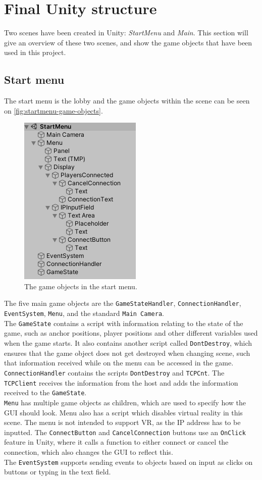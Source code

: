 \section{Final Unity structure}
Two scenes have been created in Unity: \textit{StartMenu} and \textit{Main}.
This section will give an overview of these two scenes, and show the game objects that have been used in this project.

\subsection{Start menu}
The start menu is the lobby and the game objects within the scene can be seen on \autoref{fig:startmenu-game-objects}.

\begin{figure}[H]
    \centering
    \includegraphics[width=0.4\linewidth]{figures/startmenu.PNG}
    \caption{The game objects in the start menu.}
    \label{fig:startmenu-game-objects}
\end{figure}
\noindent
The five main game objects are the \texttt{GameStateHandler}, \texttt{ConnectionHandler}, \texttt{EventSystem}, \texttt{Menu}, and the standard \texttt{Main Camera}.
\\
The \texttt{GameState} contains a script with information relating to the state of the game, such as anchor positions, player positions and other different variables used when the game starts.
It also contains another script called \texttt{DontDestroy}, which ensures that the game object does not get destroyed when changing scene, such that information received while on the menu can be accessed in the game.
\\
\texttt{ConnectionHandler} contains the scripts \texttt{DontDestroy} and \texttt{TCPCnt}.
The \texttt{TCPClient} receives the information from the host and adds the information received to the \texttt{GameState}.
\\
\texttt{Menu} has multiple game objects as children, which are used to specify how the GUI should look.
Menu also has a script which disables virtual reality in this scene.
The menu is not intended to support VR, as the IP address has to be inputted.
The \texttt{ConnectButton} and \texttt{CancelConnection} buttons use an \texttt{OnClick} feature in Unity, where it calls a function to either connect or cancel the connection, which also changes the GUI to reflect this.
\\
The \texttt{EventSystem} supports sending events to objects based on input as clicks on buttons or typing in the text field.

